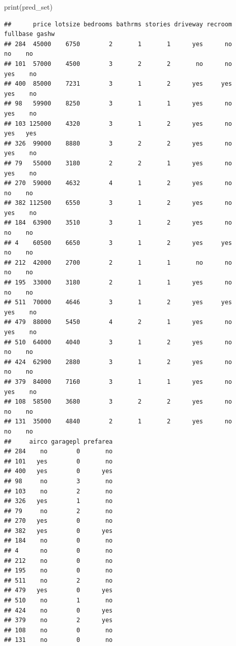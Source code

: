 \documentclass[
]{article}
\newenvironment{Shaded}{\begin{snugshade}}{\end{snugshade}}
\newcommand{\FunctionTok}[1]{\textcolor[rgb]{0.00,0.00,0.00}{#1}}
\newcommand{\NormalTok}[1]{#1}
\begin{document}
\begin{Shaded}
\begin{Highlighting}[]
\FunctionTok{print}\NormalTok{(pred\_set)}
\end{Highlighting}
\end{Shaded}

\begin{verbatim}
##      price lotsize bedrooms bathrms stories driveway recroom fullbase gashw
## 284  45000    6750        2       1       1      yes      no       no    no
## 101  57000    4500        3       2       2       no      no      yes    no
## 400  85000    7231        3       1       2      yes     yes      yes    no
## 98   59900    8250        3       1       1      yes      no      yes    no
## 103 125000    4320        3       1       2      yes      no      yes   yes
## 326  99000    8880        3       2       2      yes      no      yes    no
## 79   55000    3180        2       2       1      yes      no      yes    no
## 270  59000    4632        4       1       2      yes      no       no    no
## 382 112500    6550        3       1       2      yes      no      yes    no
## 184  63900    3510        3       1       2      yes      no       no    no
## 4    60500    6650        3       1       2      yes     yes       no    no
## 212  42000    2700        2       1       1       no      no       no    no
## 195  33000    3180        2       1       1      yes      no       no    no
## 511  70000    4646        3       1       2      yes     yes      yes    no
## 479  88000    5450        4       2       1      yes      no      yes    no
## 510  64000    4040        3       1       2      yes      no       no    no
## 424  62900    2880        3       1       2      yes      no       no    no
## 379  84000    7160        3       1       1      yes      no      yes    no
## 108  58500    3680        3       2       2      yes      no       no    no
## 131  35000    4840        2       1       2      yes      no       no    no
##     airco garagepl prefarea
## 284    no        0       no
## 101   yes        0       no
## 400   yes        0      yes
## 98     no        3       no
## 103    no        2       no
## 326   yes        1       no
## 79     no        2       no
## 270   yes        0       no
## 382   yes        0      yes
## 184    no        0       no
## 4      no        0       no
## 212    no        0       no
## 195    no        0       no
## 511    no        2       no
## 479   yes        0      yes
## 510    no        1       no
## 424    no        0      yes
## 379    no        2      yes
## 108    no        0       no
## 131    no        0       no
\end{verbatim}
\end{document}

